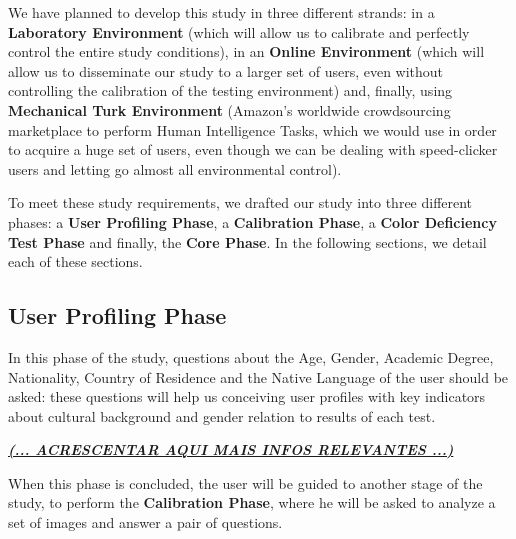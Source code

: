 We have planned to develop this study in three different strands: in a \textbf{Laboratory Environment} (which will allow us to calibrate and perfectly control the entire study conditions), in an \textbf{Online Environment} (which will allow us to disseminate our study to a larger set of users, even without controlling the calibration of the testing environment) and, finally, using \textbf{Mechanical Turk Environment} (Amazon's worldwide crowdsourcing marketplace to perform Human Intelligence Tasks, which we would use in order to acquire a huge set of users, even though we can be dealing with speed-clicker users and letting go almost all environmental control). \par
%
To meet these study requirements, we drafted our study into three different phases: a \textbf{User Profiling Phase}, a \textbf{Calibration Phase}, a \textbf{Color Deficiency Test Phase} and finally, the \textbf{Core Phase}. In the following sections, we detail each of these sections. \par
%
\subsection{User Profiling Phase}
\label{sec:researchprop_userprofiling}
%
In this phase of the study, questions about the Age, Gender, Academic Degree, Nationality, Country of Residence and the Native Language of the user should be asked: these questions will help us conceiving user profiles with key indicators about cultural background and gender relation to results of each test. \par
%
\textbf{\underline{\emph{(... ACRESCENTAR AQUI MAIS INFOS RELEVANTES ...)}}} \par
%
When this phase is concluded, the user will be guided to another stage of the study, to perform the \textbf{Calibration Phase}, where he will be asked to analyze a set of images and answer a pair of questions. \par
%
